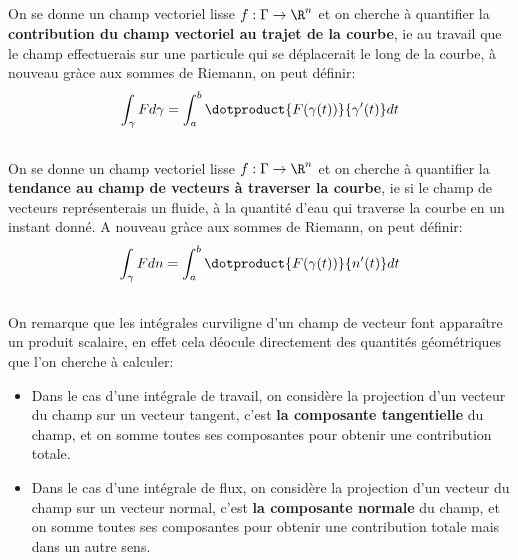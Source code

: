 \subsection*{}
On se donne un champ vectoriel lisse \(f : \Gamma \rightarrow \R^n\) et on cherche à quantifier la \textbf{contribution du champ vectoriel au trajet de la courbe}, ie au travail que le champ effectuerais sur une particule qui se déplacerait le long de la courbe, à nouveau gràce aux sommes de Riemann, on peut définir:
\[
   \int_{\gamma} F d \gamma = \int_{a}^{b} \dotproduct{F(\gamma(t))}{\gamma'(t)}dt
\]
\subsection*{}
On se donne un champ vectoriel lisse \(f : \Gamma \rightarrow \R^n\) et on cherche à quantifier la \textbf{tendance au champ de vecteurs à traverser la courbe}, ie si le champ de vecteurs représenterais un fluide, à la quantité d'eau qui traverse la courbe en un instant donné. A nouveau gràce aux sommes de Riemann, on peut définir:
\[
   \int_{\gamma} F d n = \int_{a}^{b} \dotproduct{F(\gamma(t))}{n'(t)}d t
\]
\subsection*{}
On remarque que les intégrales curviligne d'un champ de vecteur font apparaître un produit scalaire, en effet cela déocule directement des quantités géométriques que l'on cherche à calculer:
\begin{itemize}
   \item Dans le cas d'une intégrale de travail, on considère la projection d'un vecteur du champ sur un vecteur tangent, c'est \textbf{la composante tangentielle} du champ, et on somme toutes ses composantes pour obtenir une contribution totale.
   \item Dans le cas d'une intégrale de flux, on considère la projection d'un vecteur du champ sur un vecteur normal, c'est \textbf{la composante normale} du champ, et on somme toutes ses composantes pour obtenir une contribution totale mais dans un autre sens.
\end{itemize}
